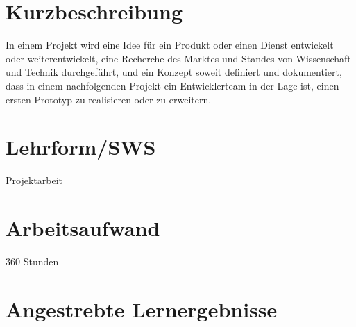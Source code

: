 \section*{Kurzbeschreibung\label{/mi-2017/modulbeschreibungen-master/MA_Modul_Projekt_Vision&Konzept}}\label{kurzbeschreibungpathlabelmi-2017modulbeschreibungen-mastermaux5fmodulux5fprojektux5fvisionkonzept}

In einem Projekt wird eine Idee für ein Produkt oder einen Dienst
entwickelt oder weiterentwickelt, eine Recherche des Marktes und Standes
von Wissenschaft und Technik durchgeführt, und ein Konzept soweit
definiert und dokumentiert, dass in einem nachfolgenden Projekt ein
Entwicklerteam in der Lage ist, einen ersten Prototyp zu realisieren
oder zu erweitern.

\section*{Lehrform/SWS
\label{/mi-2017/modulbeschreibungen-master/MA_Modul_Projekt_Vision&Konzept}}\label{lehrformsws-pathlabelmi-2017modulbeschreibungen-mastermaux5fmodulux5fprojektux5fvisionkonzept}

Projektarbeit

\section*{Arbeitsaufwand
\label{/mi-2017/modulbeschreibungen-master/MA_Modul_Projekt_Vision&Konzept}}\label{arbeitsaufwand-pathlabelmi-2017modulbeschreibungen-mastermaux5fmodulux5fprojektux5fvisionkonzept}

360 Stunden

\section*{Angestrebte
Lernergebnisse\label{/mi-2017/modulbeschreibungen-master/MA_Modul_Projekt_Vision&Konzept}}\label{angestrebte-lernergebnissepathlabelmi-2017modulbeschreibungen-mastermaux5fmodulux5fprojektux5fvisionkonzept}

